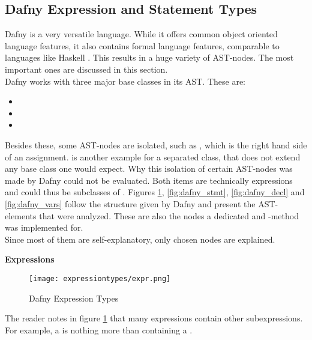 

\subsection{Dafny Expression and Statement Types}
\label{section:analysis_dafnyASTStuff}
Dafny is a very versatile language.
While it offers common object oriented language features, it also contains formal language features, comparable to languages like Haskell \cite{haskell}.
This results in a huge variety of AST-nodes.
The most important ones are discussed in this section.\\

Dafny works with three major base classes in its AST.
These are:
\begin{itemize}
    \item {}
    \item {}
    \item {}
\end{itemize}
Besides these, some AST-nodes are isolated, such as , which is the right hand side of an assignment.
 is another example for a separated class, that does not extend any base class one would expect.
Why this isolation of certain AST-nodes was made by Dafny could not be evaluated.
Both items are technically expressions and could thus be subclasses of .
Figures \ref{fig:dafny_expr}, \ref{fig:dafny_stmt}, \ref{fig:dafny_decl} and \ref{fig:dafny_vars} follow the structure given by Dafny and present the AST-elements that were analyzed.
These are also the nodes a dedicated  and -method was implemented for.\\

Since most of them are self-explanatory, only chosen nodes are explained.

\pagebreak

\textbf{Expressions}\\
\begin{figure}[H]
    \centering
    \texttt{[image: expressiontypes/expr.png]}
    \caption{Dafny Expression Types}
    \label{fig:dafny_expr}
\end{figure}

The reader notes in figure \ref{fig:dafny_expr} that many expressions contain other subexpressions.
For example, a \linebreak {} is nothing more than containing a .\\

